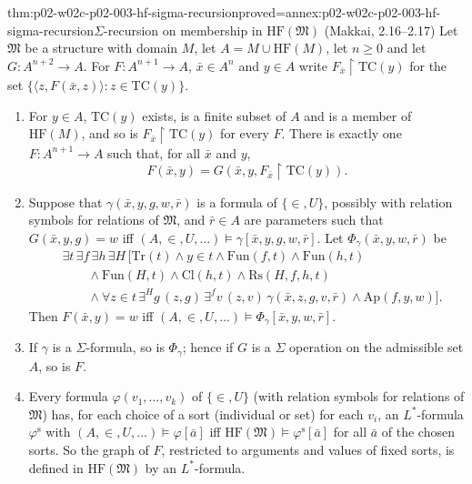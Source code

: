 \begin{hbtheorem}{thm:p02-w02c-p02-003-hf-sigma-recursion}{proved=annex:p02-w02c-p02-003-hf-sigma-recursion}{\(\Sigma\)-recursion on membership in \(\mathrm{HF}(\mathfrak M)\) (Makkai, 2.16--2.17)}
Let \(\mathfrak M\) be a structure with domain \(M\), let
\(A=M\cup\mathrm{HF}(M)\), let \(n\geq0\) and let \(G\colon
A^{n+2}\to A\).  For \(F\colon A^{n+1}\to A\), \(\bar x\in A^{n}\) and
\(y\in A\) write \(F_{\bar x}\restriction\mathrm{TC}(y)\) for the set
\(\{\langle z,F(\bar x,z)\rangle:z\in\mathrm{TC}(y)\}\).
\begin{enumerate}
\item For \(y\in A\), \(\mathrm{TC}(y)\) exists, is a finite subset of
      \(A\) and is a member of \(\mathrm{HF}(M)\), and so is \(F_{\bar
      x}\restriction\mathrm{TC}(y)\) for every \(F\).  There is exactly one
      \(F\colon A^{n+1}\to A\) such that, for all \(\bar x\) and \(y\),
      \[
       F(\bar x,y)=G(\bar x,y,F_{\bar x}\restriction\mathrm{TC}(y)).
      \]
\item Suppose that \(\gamma(\bar x,y,g,w,\bar r)\) is a formula of
      \(\{\in,U\}\), possibly with relation symbols for relations of
      \(\mathfrak M\), and \(\bar r\in A\) are parameters such that
      \(G(\bar x,y,g)=w\) iff \((A,\in,U,\ldots)\models\gamma[\bar
      x,y,g,w,\bar r]\).  Let \(\Phi_\gamma(\bar x,y,w,\bar r)\) be
      \[
      \begin{aligned}
      &\exists t\,\exists f\,\exists h\,\exists H\,\bigl[\mathrm{Tr}(t)\land
       y\in t\land\mathrm{Fun}(f,t)\land\mathrm{Fun}(h,t)\\
      &\qquad{}\land\mathrm{Fun}(H,t)
       \land\mathrm{Cl}(h,t)\land\mathrm{Rs}(H,f,h,t)\\
      &\qquad{}\land\forall z\in t\,\exists^{H}g\,(z,g)\,
       \exists^{f}v\,(z,v)\,\gamma(\bar x,z,g,v,\bar r)
       \land\mathrm{Ap}(f,y,w)\bigr].
      \end{aligned}
      \]
      Then \(F(\bar x,y)=w\) iff \((A,\in,U,\ldots)\models\Phi_\gamma[\bar
      x,y,w,\bar r]\).
\item If \(\gamma\) is a \(\Sigma\)-formula, so is \(\Phi_\gamma\); hence
      if \(G\) is a \(\Sigma\) operation on the admissible set \(A\), so is
      \(F\).
\item Every formula \(\varphi(v_1,\ldots,v_k)\) of \(\{\in,U\}\) (with
      relation symbols for relations of \(\mathfrak M\)) has, for each
      choice of a sort (individual or set) for each \(v_i\), an
      \(L^{*}\)-formula \(\varphi^{\mathrm s}\) with
      \((A,\in,U,\ldots)\models\varphi[\bar a]\) iff
      \(\mathrm{HF}(\mathfrak M)\models\varphi^{\mathrm s}[\bar a]\) for all
      \(\bar a\) of the chosen sorts.  So the graph of \(F\), restricted to
      arguments and values of fixed sorts, is defined in
      \(\mathrm{HF}(\mathfrak M)\) by an \(L^{*}\)-formula.
\end{enumerate}
\end{hbtheorem}

